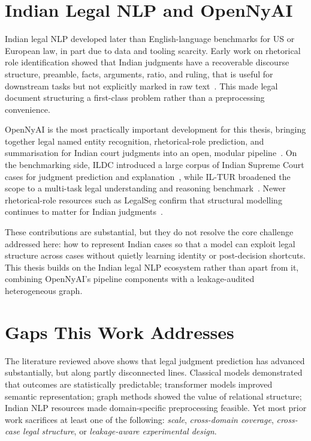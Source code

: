 \section{Indian Legal NLP and OpenNyAI}

Indian legal NLP developed later than English-language benchmarks for US or European law, in part due to data and tooling scarcity. Early work on rhetorical role identification showed that Indian judgments have a recoverable discourse structure, preamble, facts, arguments, ratio, and ruling, that is useful for downstream tasks but not explicitly marked in raw text~\cite{bhattacharya2019rhetoricalroles}. This made legal document structuring a first-class problem rather than a preprocessing convenience.

OpenNyAI is the most practically important development for this thesis, bringing together legal named entity recognition, rhetorical-role prediction, and summarisation for Indian court judgments into an open, modular pipeline~\cite{kalamkar2022ner, opennyai2024docs, opennyai2024about}. On the benchmarking side, ILDC introduced a large corpus of Indian Supreme Court cases for judgment prediction and explanation~\cite{malik2021ildc}, while IL-TUR broadened the scope to a multi-task legal understanding and reasoning benchmark~\cite{joshi2024iltur}. Newer rhetorical-role resources such as LegalSeg confirm that structural modelling continues to matter for Indian judgments~\cite{nigam2025legalseg}.

These contributions are substantial, but they do not resolve the core challenge addressed here: how to represent Indian cases so that a model can exploit legal structure across cases without quietly learning identity or post-decision shortcuts. This thesis builds on the Indian legal NLP ecosystem rather than apart from it, combining OpenNyAI's pipeline components with a leakage-audited heterogeneous graph.

\section{Gaps This Work Addresses}

The literature reviewed above shows that legal judgment prediction has advanced substantially, but along partly disconnected lines. Classical models demonstrated that outcomes are statistically predictable; transformer models improved semantic representation; graph methods showed the value of relational structure; Indian NLP resources made domain-specific preprocessing feasible. Yet most prior work sacrifices at least one of the following: \emph{scale}, \emph{cross-domain coverage}, \emph{cross-case legal structure}, or \emph{leakage-aware experimental design}.

